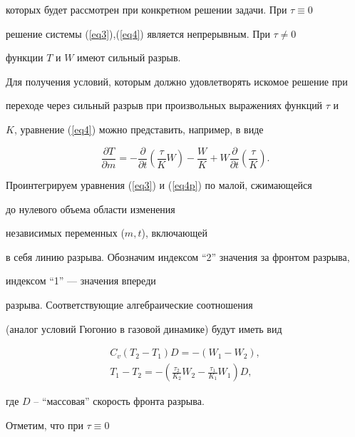 которых будет рассмотрен при конкретном решении задачи. При $\tau\equiv0$


решение системы (\ref{eq3}),(\ref{eq4}) является непрерывным. При $\tau\ne0$


функции $T$ и $W$ имеют сильный разрыв.





Для получения условий, которым должно удовлетворять искомое решение при


переходе через сильный разрыв при произвольных выражениях функций $\tau$ и


$K$, уравнение (\ref{eq4}) можно представить, например, в виде


\begin{equation}\label{eq4p}


\frac{\partial T}{\partial m}=


-\frac{\partial}{\partial t}\left(\frac{\tau}{K}W\right)


-\frac{W}{K}+W\frac{\partial}{\partial t}\left(\frac{\tau}{K}\right).


\end{equation}


Проинтегрируем уравнения (\ref{eq3}) и (\ref{eq4p}) по малой, сжимающейся


до нулевого объема области изменения 


независимых переменных ($m,t$), включающей


в себя линию разрыва. Обозначим индексом ``2'' значения за фронтом разрыва,


индексом ``1'' --- значения впереди 


разрыва. Соответствующие алгебраические соотношения


(аналог условий Гюгонио в газовой динамике) будут иметь вид


\begin{gather}


\label{eq5}


C_v(T_2-T_1)D=-(W_1-W_2),\\


\label{eq6}


T_1-T_2=-\left(\frac{\tau_2}{K_2}W_2-\frac{\tau_1}{K_1}W_1\right)D,


\end{gather}


где $D$ -- ``массовая'' скорость фронта разрыва.





Отметим, что при $\tau\equiv0$ 


